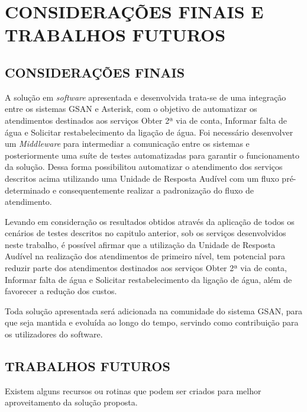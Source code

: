 \chapter[Considerações Finais e Trabalhos Futuros]{\uppercase{Considerações Finais e Trabalhos Futuros}}

\section{\uppercase{Considerações Finais}}
A solução em \textit{software} apresentada e desenvolvida trata-se de uma integração entre os sistemas GSAN e Asterisk, com o objetivo de automatizar os atendimentos destinados aos serviços Obter 2ª via de conta, Informar falta de água e Solicitar restabelecimento da ligação de água. Foi necessário desenvolver um \textit{Middleware} para intermediar a comunicação entre os sistemas e posteriormente uma suíte de testes automatizadas para garantir o funcionamento da solução. Dessa forma possibilitou automatizar o atendimento dos serviços descritos acima utilizando uma Unidade de Resposta Audível com um fluxo pré-determinado e consequentemente realizar a padronização do fluxo de atendimento.

Levando em consideração os resultados obtidos através da aplicação de todos os cenários de testes descritos no capitulo anterior, sob os serviços desenvolvidos neste trabalho, é possível afirmar que a utilização da Unidade de Resposta Audível na realização dos atendimentos de primeiro nível, tem potencial para reduzir parte dos atendimentos destinados aos serviços Obter 2ª via de conta, Informar falta de água e Solicitar restabelecimento da ligação de água, além de favorecer a redução dos custos.

Toda solução apresentada será adicionada na comunidade do sistema GSAN, para que seja mantida e evoluída ao longo do tempo, servindo como contribuição para os utilizadores do software.

\section{\uppercase{Trabalhos Futuros}}

Existem alguns recursos ou rotinas que podem ser criados para melhor aproveitamento da solução proposta.

